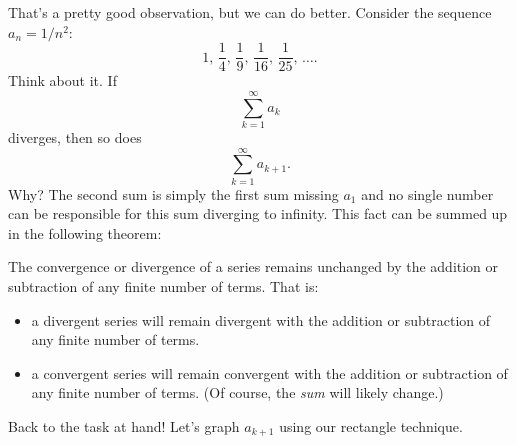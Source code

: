 \documentclass{ximera}
\begin{document}
That's a pretty good observation, but we can do better. Consider the
sequence $a_n = 1/n^2$:
\[
1, \, \frac{1}{4}, \, \frac{1}{9}, \, \frac{1}{16}, \, \frac{1}{25}, \,\dots  .
\]
Think about it. If
\[
\sum_{k=1}^\infty a_k
\]
diverges, then so does
\[
\sum_{k=1}^\infty a_{k+1}.
\]
Why?  The second sum is simply the first sum missing $a_1$ and no single number can
be responsible for this sum diverging to infinity. This fact can be summed up in the following theorem:

\begin{theorem}
The convergence or divergence of a series remains unchanged by the addition or
subtraction of any finite number of terms. That is:
\begin{itemize}
\item a divergent series will remain divergent with the addition or
  subtraction of any finite number of terms.
\item a convergent series will remain convergent with the addition or
  subtraction of any finite number of terms. (Of course, the
  \emph{sum} will likely change.)
\end{itemize}
\end{theorem}
Back to the task at hand! Let's graph $a_{k+1}$ using our rectangle technique.
\end{document}
